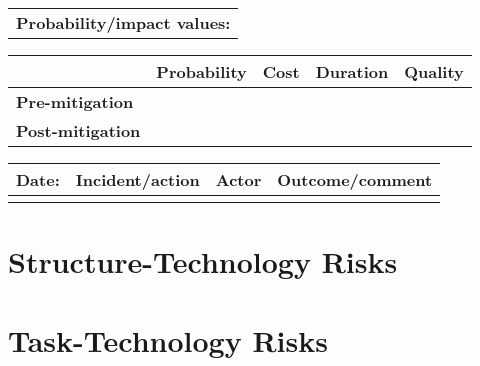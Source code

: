 \begin{table}
\begin{tabularx}{\textwidth}{| X |}
	\end{tabularx}
	\begin{tabularx}{\textwidth}{| X |}
		\hline
		\textbf{Probability/impact values:} \\
	\end{tabularx}
	\begin{tabularx}{\textwidth}{| l | l | X | X | X |}
		\hline
		 &  \textbf{Probability} & \textbf{Cost} & \textbf{Duration} & \textbf{Quality} \\ \hline
		\textbf{Pre-mitigation} & & & & \\ \hline
		\textbf{Post-mitigation} & & & & \\ \hline \hline
	\end{tabularx}
	\begin{tabularx}{\textwidth}{| l | X | l | X |}
		\hline
		\textbf{Date:} & \textbf{Incident/action} & \textbf{Actor} & \textbf{Outcome/comment} \\ \hline
		 & &  &  \\ \hline
	\end{tabularx}%
\end{table}

\FloatBarrier

\section{Structure-Technology Risks}
\label{Structure-Technology_Risks}

\FloatBarrier

\FloatBarrier

\section{Task-Technology Risks}
\label{Task-Technology_Risks}

\FloatBarrier

\FloatBarrier
